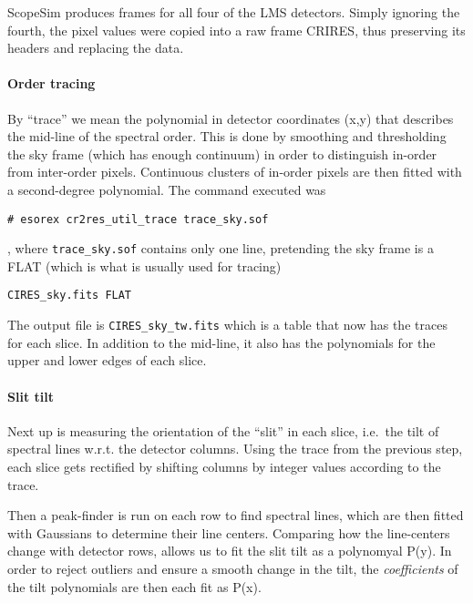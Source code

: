 ScopeSim produces frames for all four of the LMS detectors. Simply
ignoring the fourth, the pixel values were copied into a raw frame
CRIRES, thus preserving its headers and replacing the data.

\paragraph{Order tracing}

By ``trace'' we mean the polynomial in detector coordinates (x,y) that
describes the mid-line of the spectral order. This is done by smoothing
and thresholding the sky frame (which has enough continuum) in order to
distinguish in-order from inter-order pixels. Continuous clusters of
in-order pixels are then fitted with a second-degree polynomial. The
command executed was

\begin{verbatim}
# esorex cr2res_util_trace trace_sky.sof
\end{verbatim}

, where \texttt{trace\_sky.sof} contains only one line, pretending the
sky frame is a FLAT (which is what is usually used for tracing)

\begin{verbatim}
CIRES_sky.fits FLAT
\end{verbatim}

The output file is \texttt{CIRES\_sky\_tw.fits} which is a table that
now has the traces for each slice. In addition to the mid-line, it also
has the polynomials for the upper and lower edges of each slice.

\paragraph{Slit tilt}

Next up is measuring the orientation of the ``slit'' in each slice,
i.e.~the tilt of spectral lines w.r.t. the detector columns. Using the
trace from the previous step, each slice gets rectified by shifting
columns by integer values according to the trace.

Then a peak-finder is run on each row to find spectral lines, which are
then fitted with Gaussians to determine their line centers. Comparing
how the line-centers change with detector rows, allows us to fit the
slit tilt as a polynomyal P(y). In order to reject outliers and ensure a
smooth change in the tilt, the \emph{coefficients} of the tilt
polynomials are then each fit as P(x).

